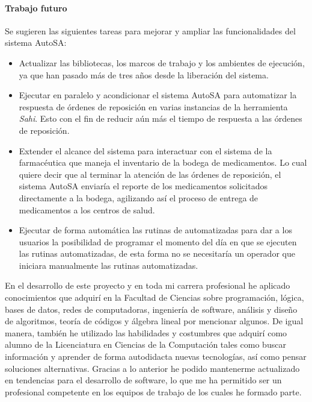 \paragraph{Trabajo futuro\\}
Se sugieren las siguientes tareas para mejorar y ampliar las funcionalidades del sistema AutoSA:
\begin{itemize}
	\item Actualizar las bibliotecas, los marcos de trabajo y los ambientes de ejecución, ya que han pasado más de tres años desde la liberación del sistema.
	\item Ejecutar en paralelo y acondicionar el sistema AutoSA para automatizar la respuesta de órdenes de reposición en varias instancias de la herramienta \textit{Sahi}. Esto con el fin de reducir aún más el tiempo de respuesta a las órdenes de reposición.
	\item Extender el alcance del sistema para interactuar con el sistema de la farmacéutica que maneja el inventario de la bodega de medicamentos. Lo cual quiere decir que al terminar la atención de las órdenes de reposición, el sistema AutoSA enviaría el reporte de los medicamentos solicitados directamente a la bodega, agilizando así el proceso de entrega de medicamentos a los centros de salud. 
	\item Ejecutar de forma automática las rutinas de automatizadas para dar a los usuarios la posibilidad de programar el momento del día en que se ejecuten las rutinas automatizadas, de esta forma no se necesitaría un operador que iniciara manualmente las rutinas automatizadas.
\end{itemize}
En el desarrollo de este proyecto y en toda mi carrera profesional he aplicado conocimientos que adquirí en la Facultad de Ciencias sobre programación, lógica, bases de datos, redes de computadoras, ingeniería de software, análisis y diseño de algoritmos, teoría de códigos y álgebra lineal por mencionar algunos. De igual manera, también he utilizado las habilidades y costumbres que adquirí como alumno de la Licenciatura en Ciencias de la Computación tales como buscar información y aprender de forma autodidacta nuevas tecnologías, así como pensar soluciones alternativas. Gracias a lo anterior he podido mantenerme actualizado en tendencias para el desarrollo de software, lo que me ha permitido ser un profesional competente en los equipos de trabajo de los cuales he formado parte.\\

